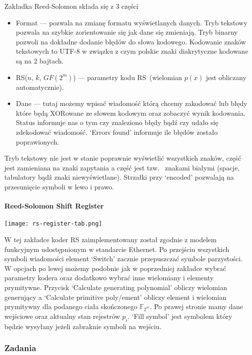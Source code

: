 Zakładka Reed-Solomon składa się z 3 części
\begin{itemize}
    \item Format --- pozwala na zmianę formatu wyświetlanych danych.
    Tryb tekstowy pozwala na szybkie zorientowanie się jak dane się
    zmieniają. Tryb binarny pozwoli na dokładne dodanie błędów do
    słowa kodowego. Kodowanie znaków tekstowych to UTF-8 w związku z
    czym polskie znaki diakrytyczne kodowane są na 2 bajtach.
    \item RS($n$, $k$, $GF(2^m)$) --- parametry kodu
    RS~(wielomian $p(x)$ jest obliczany automatycznie).
    \item Dane --- tutaj możemy wpisać wiadomość którą chcemy
    zakodować lub błędy które będą XORowane ze słowem kodowym oraz
    zobaczyć wynik kodowania. Status informuje nas o tym czy
    znaleziono błędy bądź czy udało się zdekodować wiadomość.
    `Errors found' informuje ile błędów zostało poprawionych.
\end{itemize}

Tryb tekstowy nie jest w stanie poprawnie wyświetlić wszystkich
znaków, część jest zamieniana na znaki zapytania a część jest tzw.
~znakami białymi (spacje, tabulatory bądź znaki niewyświetlane).
Strzałki przy `encoded' pozwalają na przesunięcie symboli w lewo i prawo.

\paragraph{Reed-Solomon Shift Register}
\texttt{[image: rs-register-tab.png]}

W tej zakładce koder RS zaimplementowany został zgodnie z modelem
funkcyjnym udostępnionym w standarcie Ethernet. Po przejściu
wszystkich symboli wiadomości element `Switch' zacznie przepuszczać symbole parzystości.
W opcjach po lewej możemy podobnie jak w poprzedniej zakładce wybrać
parametry kodera oraz dodatkowo wybrać inne wielomiany i elementy prymitywne. Przycisk `Calculate generating polynomial' obliczy
wielomian generujący a `Calculate primitive poly/ement' obliczy element i wielomian prymitywny dla podanego ciała skończonego $\mathbb{F}_{2^m}$.
Po prawej stronie mamy dane wejściowe oraz aktualny stan rejestrów $p_i$. `Fill symbol' jest symbolem który będzie wysyłany jeżeli zabraknie symboli na wejściu.

\subsubsection{Zadania}

